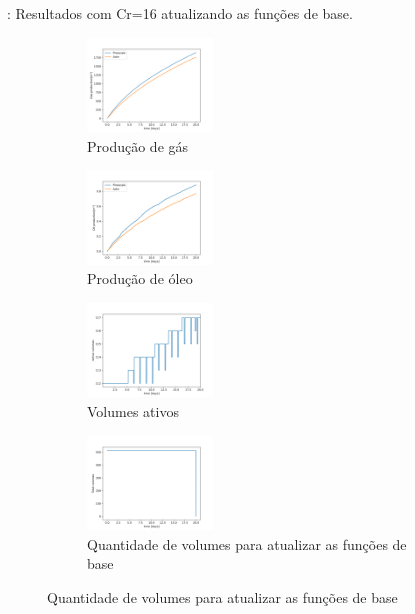 \documentclass[professionalfont]{beamer}
\begin{document}
\begin{frame}{\FrameProblemName: {\small Resultados com Cr=16 atualizando as funções de base.}}
    \begin{figure}[!ht]
        \centering
        \begin{subfigure}{.48\textwidth}
            \centering
            \includegraphics[height=2.5cm]{./imgs/pr3/cr16/Update/gas_prod.png}
            \caption{Produção de gás}
        \end{subfigure}
        \hfill
        \begin{subfigure}{.48\textwidth}
            \centering
            \includegraphics[height=2.5cm]{./imgs/pr3/cr16/Update/oil_prod.png}
            \caption{Produção de óleo}
        \end{subfigure}
        \bigskip
        \begin{subfigure}{.48\textwidth}
            \centering
            \includegraphics[height=2.5cm]{./imgs/pr3/cr16/Update/volumes_ativos.png}
            \caption{Volumes ativos}
        \end{subfigure}
        \hfill
        \begin{subfigure}{.48\textwidth}
            \centering
            \includegraphics[height=2.5cm]{./imgs/pr3/cr16/Update/volumes_update.png}
            \caption{Quantidade de volumes para atualizar as funções de base}
        \end{subfigure}
        \label{fig:fig5_pr3-cr16}
        
    \end{figure}
\end{frame}
\end{document}
